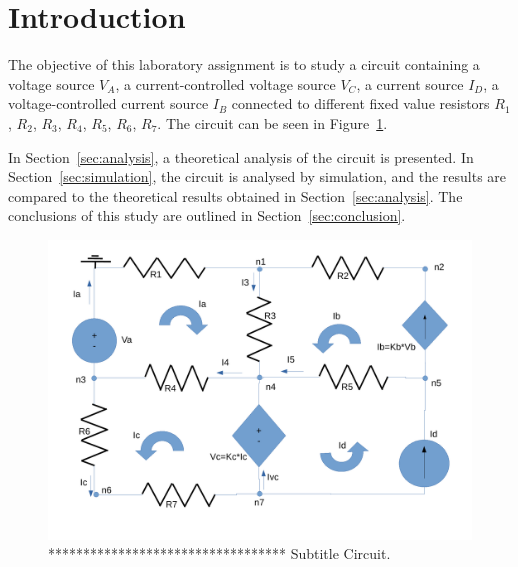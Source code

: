 \section{Introduction}
\label{sec:introduction}

The objective of this laboratory assignment is to study a circuit containing a voltage source $V_A$, a current-controlled voltage source $V_C$, a current source $I_D$, a voltage-controlled current source $I_B$ connected to different fixed value resistors $R_1$, $R_2$, $R_3$, $R_4$, $R_5$, $R_6$, $R_7$. The circuit can be seen in Figure~\ref{fig:circuit}.

In Section~\ref{sec:analysis}, a theoretical analysis of the circuit is
presented. In Section~\ref{sec:simulation}, the circuit is analysed by
simulation, and the results are compared to the theoretical results obtained in
Section~\ref{sec:analysis}. The conclusions of this study are outlined in
Section~\ref{sec:conclusion}.

\begin{figure}[h] \centering
\includegraphics[width=0.4\linewidth]{circuit.pdf}
\caption{********************************** Subtitle Circuit.}
\label{fig:circuit}
\end{figure}

